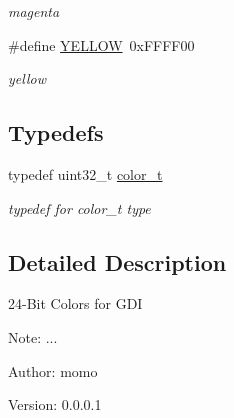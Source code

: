 \begin{CompactItemize}
\begin{CompactList}\small\item\em magenta \item\end{CompactList}\item 
\hypertarget{group__hgdi__colors24_gbf681265909adf3d3e8116c93c0ba179}{
\#define \hyperlink{group__hgdi__colors24_gbf681265909adf3d3e8116c93c0ba179}{YELLOW}~0xFFFF00}
\label{group__hgdi__colors24_gbf681265909adf3d3e8116c93c0ba179}

\begin{CompactList}\small\item\em yellow \item\end{CompactList}\end{CompactItemize}
\subsection*{Typedefs}
\begin{CompactItemize}
\item 
\hypertarget{group__hgdi__colors24_g8795f711ef385216d09794142679adf1}{
typedef uint32\_\-t \hyperlink{group__hgdi__colors24_g8795f711ef385216d09794142679adf1}{color\_\-t}}
\label{group__hgdi__colors24_g8795f711ef385216d09794142679adf1}

\begin{CompactList}\small\item\em typedef for color\_\-t type \item\end{CompactList}\end{CompactItemize}


\subsection{Detailed Description}
24-Bit Colors for GDI 

\begin{Desc}
\item[Note:]... \end{Desc}
\begin{Desc}
\item[Author:]momo \end{Desc}
\begin{Desc}
\item[Version:]0.0.0.1 \end{Desc}
